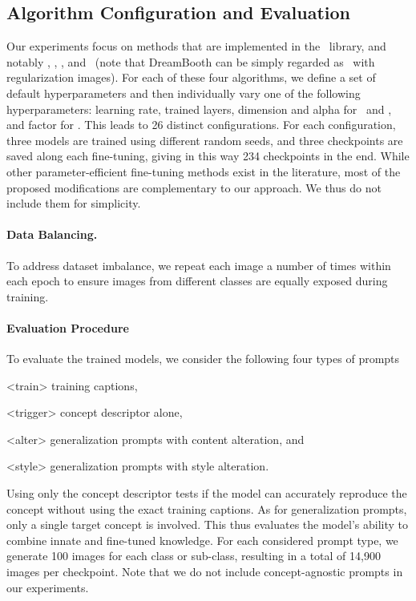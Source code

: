 
\subsection{Algorithm Configuration and Evaluation}
\label{subsec:algo-config-eval}

Our experiments focus on methods that are implemented in the \lycoris~library, and notably \lora, \loha, \lokr, and \nt~(note that DreamBooth \citealp{ruiz2023dreambooth} can be simply regarded as \nt~with regularization images).
For each of these four algorithms, we define a set of default hyperparameters and then individually vary one of the following hyperparameters: learning rate, trained layers, dimension and alpha for \lora~and \loha, and factor for \lokr. This leads to 26 distinct configurations. For each configuration, three models are trained using different random seeds, and three checkpoints are saved along each fine-tuning, giving in this way 234 checkpoints in the end.
While other parameter-efficient fine-tuning methods exist in the literature, most of the proposed modifications are complementary to our approach. We thus do not include them for simplicity.


\paragraph{Data Balancing.}
To address dataset imbalance, we repeat each image a number of times within each epoch to ensure images from different classes are equally exposed during training.

\paragraph{Evaluation Procedure\afterhead}
To evaluate the trained models, we consider the following four types of prompts
\begin{enumerate*}
    \item{} <train> training captions,
    \item{} <trigger> concept descriptor alone,
    \item{} <alter> generalization prompts with content alteration, and
    \item{} <style> generalization prompts with style alteration.
\end{enumerate*}
Using only the concept descriptor tests if the model can accurately reproduce the concept without using the exact training captions.
As for generalization prompts, only a single target concept is involved.
This thus evaluates the model's ability to combine innate and fine-tuned knowledge.
For each considered prompt type, we generate 100 images for each class or sub-class, resulting in a total of 14,900 images per checkpoint.
Note that we do not include concept-agnostic prompts in our experiments.


